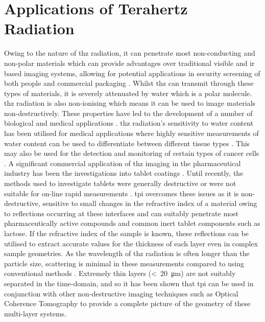\section{Applications of Terahertz Radiation}
Owing to the nature of \acrshort{thz} radiation, it can penetrate most non\nobreakdash-conducting and non\nobreakdash-polar materials which can provide advantages over traditional visible and \acrshort{ir} based imaging systems, allowing for potential applications in security screening of both people \cite{Appleby2007} and commercial packaging \cite{Federici2005}.
Whilst \acrshort{thz} can transmit through these types of materials, it is severely attenuated by water which is a polar molecule. \acrshort{thz} radiation is also non\nobreakdash-ionising which means it can be used to image materials non\nobreakdash-destructively. These properties have led to the development of a number of biological and medical applications \cite{Wu2019, Goretti2022, Chen2021, Osman2020, Ruan2019}.
\acrshort{thz} radiation's sensitivity to water content has been utilised for medical applications where highly sensitive measurements of water content can be used to differentiate between different tissue types \cite{Bennett2011}. This may also be used for the detection and monitoring of certain types of cancer cells \cite{Yu2012}. 
A significant commercial application of \acrshort{thz} imaging in the pharmaceutical industry has been the investigations into tablet coatings \cite{Ho2008}. Until recently, the methods used to investigate tablets were generally destructive or were not suitable for on\nobreakdash-line rapid measurements \cite{Mowery2002}. \acrfull{tpi} overcomes these issues as it is non\nobreakdash-destructive, sensitive to small changes in the refractive index of a material owing to reflections occurring at these interfaces and can suitably penetrate most pharmaceutically active compounds and common inert tablet components such as lactose. If the refractive index of the sample is known, these reflections can be utilised to extract accurate values for the thickness of each layer even in complex sample geometries. As the wavelength of \acrshort{thz} radiation is often longer than the particle size, scattering is minimal in these measurements compared to using conventional methods \cite{Korasa2018}. Extremely thin layers (<~\SI{20}{\micro\metre}) are not suitably separated in the time\nobreakdash-domain, and so it has been shown that \acrshort{tpi} can be used in conjunction with other non-destructive imaging techniques such as Optical Coherence Tomography \cite{Lin2017} to provide a complete picture of the geometry of these multi-layer systems. 


